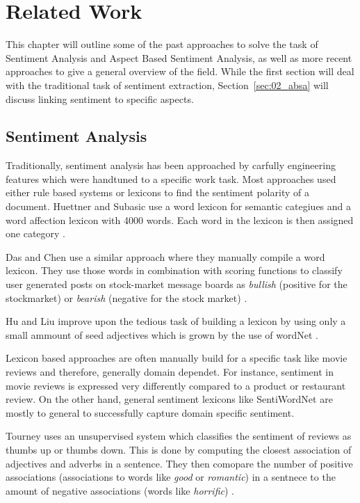 \chapter{Related Work}
\label{ch:relWork}

This chapter will outline some of the past approaches to solve the task of Sentiment Analysis and Aspect Based Sentiment Analysis, as well as more recent approaches to give a general overview of the field. While the first section will deal with the traditional task of sentiment extraction, Section~\ref{sec:02_absa} will discuss linking sentiment to specific aspects.

\section{Sentiment Analysis}

Traditionally, sentiment analysis has been approached by carfully engineering features which were handtuned to a specific work task. Most approaches used either rule based systems \cite{Popescu2005} or lexicons to find the sentiment polarity of a document. Huettner and Subasic use a word lexicon for semantic categiues and a word affection lexicon with 4000 words. Each word in the lexicon is then assigned one category \cite{Huettner2000}. 

Das and Chen use a similar approach where they manually compile a word lexicon. They use those words in combination with scoring functions to classify user generated posts on stock-market message boards as \textit{bullish} {(positive for the stockmarket)} or \textit{bearish} {(negative for the stock market)} \cite{Das2007}.

Hu and Liu improve upon the tedious task of building a lexicon by using only a small ammount of seed adjectives which is grown by the use of wordNet \cite{Hu2004}.
\medskip

Lexicon based approaches are often manually build for a specific task like movie reviews \cite{Tong2001, Thet2010} and therefore, generally domain dependet. For instance, sentiment in movie reviews is expressed very differently compared to a product or restaurant review. On the other hand, general sentiment lexicons like SentiWordNet \cite{Baccianella2010} are mostly to general to successfully capture domain specific sentiment.
\medskip

Tourney uses an unsupervised system which classifies the sentiment of reviews as thumbs up or thumbs down. This is done by computing the closest association of adjectives and adverbs in a sentence. They then comopare the number of positive associations {(associations to words like \textit{good} or \textit{romantic})} in a sentnece to the amount of negative associations {(words like \textit{horrific})} \cite{Turney2007}.
\medskip

